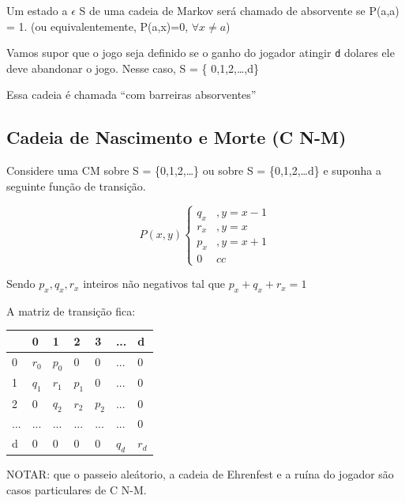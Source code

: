 \documentclass[]{article}
\theoremstyle{definition}
\theoremstyle{definition}
\theoremstyle{definition}
\theoremstyle{remark}
\let\BeginKnitrBlock\begin \let\EndKnitrBlock\end
\begin{document}
\BeginKnitrBlock{definition}
\protect\hypertarget{def:unnamed-chunk-30}{}{\label{def:unnamed-chunk-30}
}Um estado a \(\epsilon\) S de uma cadeia de Markov será chamado de
absorvente se P(a,a) = 1. (ou equivalentemente, P(a,x)=0,
\(\forall x \neq a\))

Vamos supor que o jogo seja definido se o ganho do jogador atingir
\texttt{d} dolares ele deve abandonar o jogo. Nesse caso, S = \{
0,1,2,\ldots{},d\}

Essa cadeia é chamada ``com barreiras absorventes''
\EndKnitrBlock{definition}

\subsection{\texorpdfstring{Cadeia de Nascimento e Morte \textbf{(C
N-M)}}{Cadeia de Nascimento e Morte (C N-M)}}\label{cadeia-de-nascimento-e-morte-c-n-m}

Considere uma CM sobre S = \{0,1,2,\ldots{}\} ou sobre S =
\{0,1,2,\ldots{}d\} e suponha a seguinte função de transição.

\begin{equation}
P(x,y)\left\{\begin{matrix}
q_x &, y = x -1\\
r_x &, y = x \\
p_x &, y = x + 1 \\
0 & cc
\end{matrix}\right.
\end{equation}

Sendo \(p_x, q_x, r_x\) inteiros não negativos tal que
\(p_x + q_x + r_x = 1\)

A matriz de transição fica:

\begin{tabular}{l|l|l|l|l|l|l}
\hline
  & 0 & 1 & 2 & 3 & ... & d\\
\hline
0 & $r_0$ & $p_0$ & 0 & 0 & ... & 0\\
\hline
1 & $q_1$ & $r_1$ & $p_1$ & 0 & ... & 0\\
\hline
2 & 0 & $q_2$ & $r_2$ & $p_2$ & ... & 0\\
\hline
... & ... & ... & ... & ... & ... & 0\\
\hline
d & 0 & 0 & 0 & 0 & $q_d$ & $r_d$\\
\hline
\end{tabular}

NOTAR: que o passeio aleátorio, a cadeia de Ehrenfest e a ruína do
jogador são casos particulares de C N-M.
\end{document}
